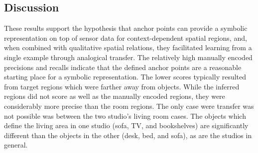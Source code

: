 
\subsection{Discussion}

These results support the hypothesis that anchor points can provide a symbolic representation on top of sensor data for context-dependent spatial regions, and, when combined with qualitative spatial relations, they facilitated learning from a single example through analogical transfer. The relatively high manually encoded precisions and recalls indicate that the defined anchor points are a reasonable starting place for a symbolic representation. The lower scores typically resulted from target regions which were farther away from objects. While the inferred regions did not score as well as the manually encoded regions, they were considerably more precise than the room regions. The only case were transfer was not possible was between the two studio's living room cases. The objects which define the living area in one studio (sofa, TV, and bookshelves) are significantly different than the objects in the other (desk, bed, and sofa), as are the studios in general.

